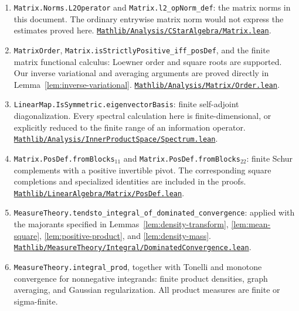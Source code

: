 \documentclass[reqno,a4paper,12pt]{amsart}
\theoremstyle{definition}
\newcommand{\ml}[1]{\nolinkurl{#1}}
\begin{document}
\begin{enumerate}
\item \ml{Matrix.Norms.L2Operator} and \ml{Matrix.l2_opNorm_def}: the matrix norms in this document. The ordinary entrywise matrix norm would not express the estimates proved here.
\href{https://github.com/leanprover-community/mathlib4/blob/1ddfaa9548e05b343be9248ae08b73c3425b446e/Mathlib/Analysis/CStarAlgebra/Matrix.lean#L195}{\ml{Mathlib/Analysis/CStarAlgebra/Matrix.lean}}.
\item \ml{MatrixOrder}, \ml{Matrix.isStrictlyPositive_iff_posDef}, and the finite matrix functional calculus: Loewner order and square roots are supported. Our inverse variational and averaging arguments are proved directly in Lemma~\ref{lem:inverse-variational}.
\href{https://github.com/leanprover-community/mathlib4/blob/1ddfaa9548e05b343be9248ae08b73c3425b446e/Mathlib/Analysis/Matrix/Order.lean#L54}{\ml{Mathlib/Analysis/Matrix/Order.lean}}.
\item \ml{LinearMap.IsSymmetric.eigenvectorBasis}: finite self-adjoint diagonalization. Every spectral calculation here is finite-dimensional, or explicitly reduced to the finite range of an information operator.
\href{https://github.com/leanprover-community/mathlib4/blob/1ddfaa9548e05b343be9248ae08b73c3425b446e/Mathlib/Analysis/InnerProductSpace/Spectrum.lean#L296}{\ml{Mathlib/Analysis/InnerProductSpace/Spectrum.lean}}.
\item \ml{Matrix.PosDef.fromBlocks}$_{11}$ and \ml{Matrix.PosDef.fromBlocks}$_{22}$: finite Schur complements with a positive invertible pivot. The corresponding square completions and specialized identities are included in the proofs.
\href{https://github.com/leanprover-community/mathlib4/blob/1ddfaa9548e05b343be9248ae08b73c3425b446e/Mathlib/LinearAlgebra/Matrix/PosDef.lean#L698}{\ml{Mathlib/LinearAlgebra/Matrix/PosDef.lean}}.
\item \ml{MeasureTheory.tendsto_integral_of_dominated_convergence}: applied with the majorants specified in Lemmas~\ref{lem:density-transform}, \ref{lem:mean-square}, \ref{lem:positive-product}, and \ref{lem:density-mass}.
\href{https://github.com/leanprover-community/mathlib4/blob/1ddfaa9548e05b343be9248ae08b73c3425b446e/Mathlib/MeasureTheory/Integral/DominatedConvergence.lean#L57}{\ml{Mathlib/MeasureTheory/Integral/DominatedConvergence.lean}}.
\item \ml{MeasureTheory.integral_prod}, together with Tonelli and monotone convergence for nonnegative integrands: finite product densities, graph averaging, and Gaussian regularization. All product measures are finite or sigma-finite.

\end{enumerate}
\end{document}
